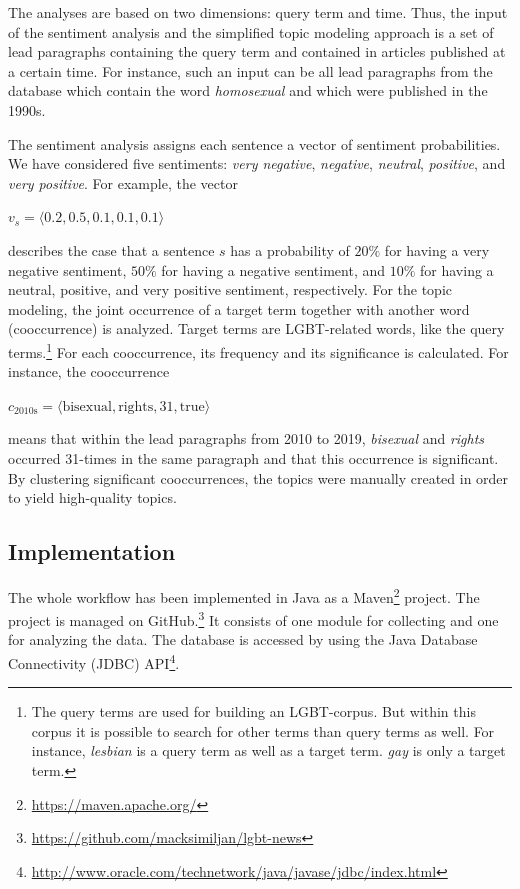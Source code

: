 \documentclass[10pt,a4paper,twocolumn]{scrartcl}
\begin{document}
The analyses are based on two dimensions: query term and time. Thus, the input of the sentiment analysis and the simplified topic modeling approach is a set of lead paragraphs containing the query term and contained in articles published at a certain time. For instance, such an input can be all lead paragraphs from the database which contain the word \textit{homosexual} and which were published in the 1990s.

The sentiment analysis assigns each sentence a vector of sentiment probabilities. We have considered five sentiments: \textit{very negative}, \textit{negative}, \textit{neutral}, \textit{positive}, and \textit{very positive}. For example, the vector \begin{center}
$v_s = \langle 0.2, 0.5, 0.1, 0.1, 0.1\rangle$
\end{center} describes the case that a sentence $s$ has a probability of $20\%$ for having a very negative sentiment, $50\%$ for having a negative sentiment, and $10\%$ for having a neutral, positive, and very positive sentiment, respectively. For the topic modeling, the joint occurrence of a target term together with another word (cooccurrence) is analyzed. Target terms are LGBT-related words, like the query terms.\footnote{The query terms are used for building an LGBT-corpus. But within this corpus it is possible to search for other terms than query terms as well. For instance, \textit{lesbian} is a query term as well as a target term. \textit{gay} is only a target term.} For each cooccurrence, its frequency and its significance is calculated. For instance, the cooccurrence \begin{center}
$c_\text{2010s} = \langle \text{bisexual}, \text{rights}, 31, \text{true}\rangle$
\end{center} means that within the lead paragraphs from 2010 to 2019, \textit{bisexual} and \textit{rights} occurred 31-times in the same paragraph and that this occurrence is significant. By clustering significant cooccurrences, the topics were manually created in order to yield high-quality topics.

\subsection*{Implementation} The whole workflow has been implemented in Java as a Maven\footnote{\url{https://maven.apache.org/}} project. The project is managed on GitHub.\footnote{\url{https://github.com/macksimiljan/lgbt-news}} It consists of one module for collecting and one for analyzing the data. The database is accessed by using the Java Database Connectivity (JDBC) API\footnote{\url{http://www.oracle.com/technetwork/java/javase/jdbc/index.html}}.
\end{document}
